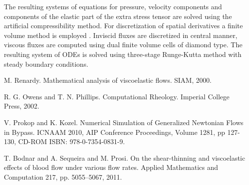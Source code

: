 The resulting systems of equations for pressure, velocity components and
components of the elastic part of the extra stress tensor are solved using the
artificial compressibility method. For discretization of spatial
derivatives a finite volume method is employed \cite{prokop}. Inviscid fluxes are discretized in central manner,
viscous fluxes are computed using dual finite volume cells of diamond type. The resulting system
of ODEs is solved using three-stage Runge-Kutta method \cite{prokop} with steady boundary conditions.


\begin{thebibliography}{10}

{\sc M. Renardy}. {Mathematical analysis of viscoelastic flows}. SIAM, 2000.



{\sc R. G. Owens and T. N. Phillips}. {Computational Rheology}. Imperial College Press, 2002.



{\sc V. Prokop and K. Kozel}. {Numerical Simulation of Generalized Newtonian Flows in Bypass}. ICNAAM 2010, AIP Conference Proceedings, Volume 1281, pp 127-130, CD-ROM ISBN: 978-0-7354-0831-9.



{\sc T. Bodnar and A. Sequeira and M. Prosi}. {On the shear-thinning and viscoelastic effects of blood flow under various flow rates}. Applied Mathematics and Computation 217, pp. 5055--5067, 2011.

\end{thebibliography}
